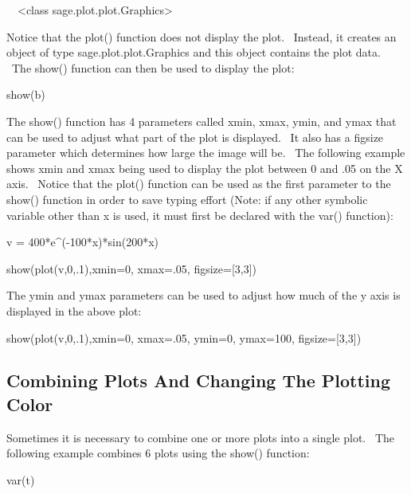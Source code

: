 \documentclass[12pt,twoside]{book}
\begin{document}
{\textbar}

\ \ {\textless}class {\textquotesingle}sage.plot.plot.Graphics{\textquotesingle}{\textgreater}


\bigskip

Notice that the plot() function does not display the plot. \ Instead, it creates an object of type sage.plot.plot.Graphics and this object contains the plot data. \ The show() function can then be used to display the plot: 

\bigskip

show(b)

{\textbar}


\bigskip

The show() function has 4 parameters called xmin, xmax, ymin, and ymax that can be used to adjust what part of the plot is displayed. \ It also has a figsize parameter which determines how large the image will be. \ The following example shows xmin and xmax being used to display the plot between 0 and .05 on the X axis. \ Notice that the plot() function can be used as the first parameter to the show() function in order to save typing effort (Note: if any other symbolic variable other than x is used, it must first be declared with the var() function): 

\bigskip

v = 400*e\^{}({}-100*x)*sin(200*x)

show(plot(v,0,.1),xmin=0, xmax=.05, figsize=[3,3])

{\textbar}


\bigskip

The ymin and ymax parameters can be used to adjust how much of the y axis is displayed in the above plot: 

\bigskip

show(plot(v,0,.1),xmin=0, xmax=.05, ymin=0, ymax=100, figsize=[3,3])

{\textbar}


\bigskip

\subsection[Combining Plots And Changing The Plotting Color]{Combining Plots And Changing The Plotting Color}

Sometimes it is necessary to combine one or more plots into a single plot. \ The following example combines 6 plots using the show() function: 

\bigskip

var({\textquotesingle}t{\textquotesingle})
\end{document}
